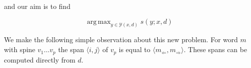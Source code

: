 \documentclass[11pt,letterpaper]{article}
\DeclareMathOperator*{\argmax}{arg\,max}
\newcommand{\Left}[1]{#1_{\Leftarrow}}
\newcommand{\Right}[1]{#1_{\Rightarrow}}
\newcommand{\Span}[1]{\langle #1 \rangle}
\begin{document}














and our aim is to find

\[ \argmax_{y \in \mathcal{Y}(x, d)} s(y; x, d)\]

We make the following simple observation about this new problem. For word $m$ with spine $v_1 \ldots v_p$ the span $\Span{i,j}$ of $v_p$ is equal to $\langle \Left{m},\Right{m}\rangle$. These spans can be computed directly from $d$.




\end{document}
